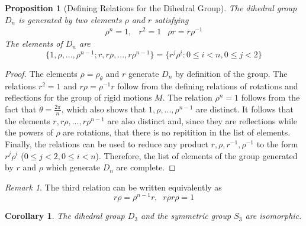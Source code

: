 \documentclass[12pt]{article}
\newtheorem{cor}[thm]{Corollary}
\newtheorem{prop}[thm]{Proposition}
\theoremstyle{definition}
\theoremstyle{remark}
\newtheorem{rmk}[thm]{Remark}
\numberwithin{equation}{section}
\begin{document}
\begin{prop}[Defining Relations for the Dihedral Group]
        The dihedral group $D_n$ is generated by two elements $\rho$ and $r$ satisfying \begin{equation}
                \begin{array}{ccc}\rho^n = 1, & r^2 = 1 & \rho r = r\rho^{-1} \end{array}
        \end{equation}
        The elements of $D_n$ are \begin{equation}
                \{1,\rho,...,\rho^{n-1};r,r\rho,...,r\rho^{n-1}\} = \{r^j\rho^i:0\leq i < n, 0\leq j < 2\}
        \end{equation}
\end{prop}
\begin{proof}
        The elements $\rho = \rho_{\theta}$ and $r$ generate $D_n$ by definition of the group. The relations $r^2 = 1$ and $r\rho = \rho^{-1}r$ follow from the defining relations of rotations and reflections for the group of rigid motions $M$. The relation $\rho^n = 1$ follows from the fact that $\theta = \frac{2\pi}{n}$, which also shows that $1,\rho,...,\rho^{n-1}$ are distinct. It follows that the elements $r,r\rho,...,r\rho^{n-1}$ are also distinct and, since they are reflections while the powers of $\rho$ are rotations, that there is no repitition in the list of elements. Finally, the relations can be used to reduce any product $r,\rho,r^{-1},\rho^{-1}$ to the form $r^j\rho^i$ ($0\leq j < 2, 0 \leq i < n$). Therefore, the list of elements of the group generated by $r$ and $\rho$ which generate $D_n$ are complete.
\end{proof}

\vspace{15pt}

\begin{rmk}
        The third relation can be written equivalently as \begin{equation}
                r\rho = \rho^{n-1}r, \;\; r\rho r\rho = 1
        \end{equation}
\end{rmk}

\vspace{15pt}

\begin{cor}
        The dihedral group $D_3$ and the symmetric group $S_3$ are isomorphic.
\end{cor}

\vspace{15pt}
\end{document}
